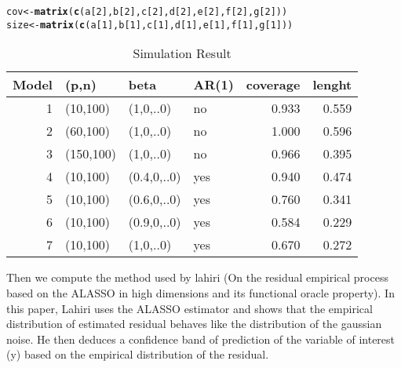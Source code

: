 \documentclass[11pt,oneside, a4paper]{amsart}\usepackage[]{graphicx}\usepackage[]{color}
\makeatletter
\newcommand{\hlnum}[1]{\textcolor[rgb]{0.686,0.059,0.569}{#1}}%
\newcommand{\hlstd}[1]{\textcolor[rgb]{0.345,0.345,0.345}{#1}}%
\newcommand{\hlkwb}[1]{\textcolor[rgb]{0.69,0.353,0.396}{#1}}%
\newcommand{\hlkwd}[1]{\textcolor[rgb]{0.737,0.353,0.396}{\textbf{#1}}}%
\newenvironment{kframe}{%
 \def\at@end@of@kframe{}%
 \ifinner\ifhmode%
  \def\at@end@of@kframe{\end{minipage}}%
  \begin{minipage}{\columnwidth}%
 \fi\fi%
 \def\FrameCommand##1{\hskip\@totalleftmargin \hskip-\fboxsep
 \colorbox{shadecolor}{##1}\hskip-\fboxsep
     \hskip-\linewidth \hskip-\@totalleftmargin \hskip\columnwidth}%
 \MakeFramed {\advance\hsize-\width
   \@totalleftmargin\z@ \linewidth\hsize
   \@setminipage}}%
 {\par\unskip\endMakeFramed%
 \at@end@of@kframe}
\newenvironment{knitrout}{}{} %
\makeatother
\begin{document}
\begin{knitrout}
\color{fgcolor}\begin{kframe}
\begin{alltt}
\hlstd{cov}\hlkwb{<-}\hlkwd{matrix}\hlstd{(}\hlkwd{c}\hlstd{(a[}\hlnum{2}\hlstd{],b[}\hlnum{2}\hlstd{],c[}\hlnum{2}\hlstd{],d[}\hlnum{2}\hlstd{],e[}\hlnum{2}\hlstd{],f[}\hlnum{2}\hlstd{],g[}\hlnum{2}\hlstd{]))}
\hlstd{size}\hlkwb{<-}\hlkwd{matrix}\hlstd{(}\hlkwd{c}\hlstd{(a[}\hlnum{1}\hlstd{],b[}\hlnum{1}\hlstd{],c[}\hlnum{1}\hlstd{],d[}\hlnum{1}\hlstd{],e[}\hlnum{1}\hlstd{],f[}\hlnum{1}\hlstd{],g[}\hlnum{1}\hlstd{]))}
\end{alltt}
\end{kframe}
\end{knitrout}



\begin{table}[ht]
\centering
\caption{Simulation Result} 
\label{Test_table}
{\footnotesize
\begin{tabular}{rlllrr}
  \toprule 
 Model & (p,n) & beta & AR(1) & coverage & lenght \\
 \midrule 
    1 & (10,100) & (1,0,..0) & no & 0.933 & 0.559 \\ 
     2 & (60,100) & (1,0,..0) & no & 1.000 & 0.596 \\ 
     3 & (150,100) & (1,0,..0) & no & 0.966 & 0.395 \\ 
     4 & (10,100) & (0.4,0,..0) & yes & 0.940 & 0.474 \\ 
     5 & (10,100) & (0.6,0,..0) & yes & 0.760 & 0.341 \\ 
     6 & (10,100) & (0.9,0,..0) & yes & 0.584 & 0.229 \\ 
     7 & (10,100) & (1,0,..0) & yes & 0.670 & 0.272 \\ 
   \bottomrule 
\end{tabular}
}
\end{table}



Then we compute the method used by lahiri (On the residual empirical process based on the ALASSO in high dimensions and its functional oracle property). In this paper, Lahiri uses the ALASSO estimator and shows that the empirical distribution of estimated residual behaves like the distribution of the gaussian noise. He then deduces a confidence band of prediction of the variable of interest (y) based on the empirical distribution of the residual.
\end{document}
